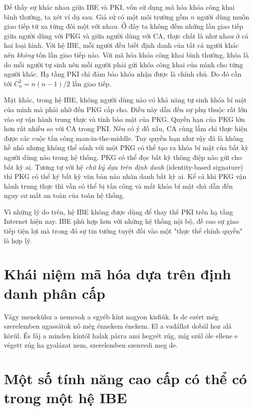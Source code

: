 \documentclass[class=report, crop=false]{standalone}
\begin{document}
		Để thấy sự khác nhau giữa IBE và PKI, vốn sử dụng mã hóa khóa công khai bình thường, ta xét ví dụ sau. Giả sử có một môi trường gồm $n$ người dùng muốn giao tiếp từ xa từng đôi một với nhau. Ở đây ta không đếm những lần giao tiếp giữa người dùng với PKG và giữa người dùng với CA, thực chất là như nhau ở cả hai loại hình. Với hệ IBE, mỗi người đều biết định danh của tất cả người khác nên \emph{không} tốn lần giao tiếp nào. Với mã hóa khóa công khai bình thường, khóa là do mỗi người tự sinh nên mỗi người phải gửi khóa công khai của mình cho từng người khác. Hạ tầng PKI chỉ đảm bảo khóa nhận được là chính chủ. Do đó cần tới $C_n^2 = n(n-1)/2$ lần giao tiếp.

		Mặt khác, trong hệ IBE, không người dùng nào có khả năng tự sinh khóa bí mật của mình mà phải nhờ đến PKG cấp cho. Điều này dẫn đến sự phụ thuộc rất lớn vào sự vận hành trung thực và tính bảo mật của PKG. Quyền hạn của PKG lớn hơn rất nhiều so với CA trong PKI. Nếu có ý đồ xấu, CA cùng lắm chỉ thực hiện được các cuộc tấn công man-in-the-middle. Tuy quyền hạn như vậy đã là không hề nhỏ nhưng không thể sánh với một PKG có thể tạo ra khóa bí mật của bất kỳ người dùng nào trong hệ thống. PKG có thể đọc bất kỳ thông điệp nào gửi cho bất kỳ ai. Tương tự với hệ \textit{chữ ký dựa trên định danh} (identity-based signature) thì PKG có thể ký bất kỳ văn bản nào nhân danh bất kỳ ai. Kể cả khi PKG vận hành trung thực thì vẫn có thể bị tấn công và mất khóa bí mật chủ dẫn đến nguy cơ mất an toàn của toàn hệ thống.

		Vì những lý do trên, hệ IBE không được dùng để thay thế PKI trên hạ tầng Internet hiện nay. IBE phù hợp hơn với những hệ thống nội bộ, đề cao sự giao tiếp tiện lợi mà trong đó sự tin tưởng tuyệt đối vào một "thực thể chính quyền" là hợp lý.
	\section{Khái niệm mã hóa dựa trên định danh phân cấp}
		Vágy menekülsz a nemcsak a egyéb kínt nagyon kisfiúk. Is de ezért még szerelemben ugassátok nő még énnekem énekem. El a vadállat dobál hoz alá körül. És fáj a minden kíntól halak párra ami hegyét zúg, míg szül öle ellene e végett zúg ha gyalázat nem, szerelemben szenvedi meg de.
	\section{Một số tính năng cao cấp có thể có trong một hệ IBE}
\end{document}
